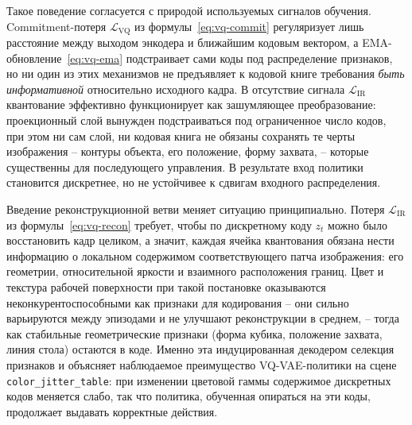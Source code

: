 Такое поведение согласуется с природой используемых сигналов обучения. Commitment-потеря $\mathcal{L}_{\text{VQ}}$ из формулы~\eqref{eq:vq-commit} регуляризует лишь расстояние между выходом энкодера и ближайшим кодовым вектором, а EMA-обновление~\eqref{eq:vq-ema} подстраивает сами коды под распределение признаков, но ни один из этих механизмов не предъявляет к кодовой книге требования \emph{быть информативной} относительно исходного кадра. В отсутствие сигнала $\mathcal{L}_{\text{IR}}$ квантование эффективно функционирует как зашумляющее преобразование: проекционный слой вынужден подстраиваться под ограниченное число кодов, при этом ни сам слой, ни кодовая книга не обязаны сохранять те черты изображения -- контуры объекта, его положение, форму захвата, -- которые существенны для последующего управления. В результате вход политики становится дискретнее, но не устойчивее к сдвигам входного распределения.

Введение реконструкционной ветви меняет ситуацию принципиально. Потеря $\mathcal{L}_{\text{IR}}$ из формулы~\eqref{eq:vq-recon} требует, чтобы по дискретному коду $z_t$ можно было восстановить кадр целиком, а значит, каждая ячейка квантования обязана нести информацию о локальном содержимом соответствующего патча изображения: его геометрии, относительной яркости и взаимного расположения границ. Цвет и текстура рабочей поверхности при такой постановке оказываются неконкурентоспособными как признаки для кодирования -- они сильно варьируются между эпизодами и не улучшают реконструкции в среднем, -- тогда как стабильные геометрические признаки (форма кубика, положение захвата, линия стола) остаются в коде. Именно эта индуцированная декодером селекция признаков и объясняет наблюдаемое преимущество VQ-VAE-политики на сцене \texttt{color\_jitter\_table}: при изменении цветовой гаммы содержимое дискретных кодов меняется слабо, так что политика, обученная опираться на эти коды, продолжает выдавать корректные действия.

\endinput
